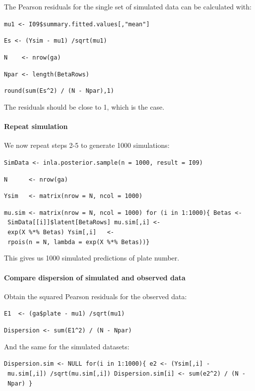 \documentclass[
]{book}
\begin{document}
The Pearson residuals for the single set of simulated data can be calculated with:

\texttt{mu1\ \textless{}-\ I09\$summary.fitted.values{[},"mean"{]}}

\texttt{Es\ \textless{}-\ (Ysim\ -\ mu1)\ /sqrt(mu1)}

\texttt{N\ \ \ \ \textless{}-\ nrow(ga)}

\texttt{Npar\ \textless{}-\ length(BetaRows)}

\texttt{round(sum(Es\^{}2)\ /\ (N\ -\ Npar),1)}

The residuals should be close to 1, which is the case.

\hypertarget{repeat-simulation}{%
\paragraph{Repeat simulation}\label{repeat-simulation}}

We now repeat steps 2-5 to generate 1000 simulations:

\texttt{SimData\ \textless{}-\ inla.posterior.sample(n\ =\ 1000,\ result\ =\ I09)}

\texttt{N\ \ \ \ \ \ \textless{}-\ nrow(ga)}

\texttt{Ysim\ \ \ \textless{}-\ matrix(nrow\ =\ N,\ ncol\ =\ 1000)}

\texttt{mu.sim\ \textless{}-\ matrix(nrow\ =\ N,\ ncol\ =\ 1000)\ for\ (i\ in\ 1:1000)\{\ Betas\ \textless{}-\ SimData{[}{[}i{]}{]}\$latent{[}BetaRows{]}\ mu.sim{[},i{]}\ \textless{}-\ exp(X\ \%*\%\ Betas)\ Ysim{[},i{]}\ \ \ \textless{}-\ rpois(n\ =\ N,\ lambda\ =\ exp(X\ \%*\%\ Betas))\}}

This gives us 1000 simulated predictions of plate number.

\hypertarget{compare-dispersion-of-simulated-and-observed-data}{%
\paragraph{Compare dispersion of simulated and observed data}\label{compare-dispersion-of-simulated-and-observed-data}}

Obtain the squared Pearson residuals for the observed data:

\texttt{E1\ \ \textless{}-\ (ga\$plate\ -\ mu1)\ /sqrt(mu1)}

\texttt{Dispersion\ \textless{}-\ sum(E1\^{}2)\ /\ (N\ -\ Npar)}

And the same for the simulated datasets:

\texttt{Dispersion.sim\ \textless{}-\ NULL\ for(i\ in\ 1:1000)\{\ e2\ \textless{}-\ (Ysim{[},i{]}\ -\ mu.sim{[},i{]})\ /sqrt(mu.sim{[},i{]})\ Dispersion.sim{[}i{]}\ \textless{}-\ sum(e2\^{}2)\ /\ (N\ -\ Npar)\ \}}
\end{document}
